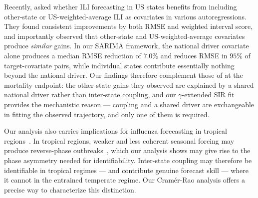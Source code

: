 \documentclass[11pt]{article}
\begin{document}
Recently, \citet{thivierge2025} asked whether ILI forecasting in US
states benefits from including other-state or US-weighted-average ILI
as covariates in various autoregressions. They found consistent
improvements by both RMSE and weighted interval score, and importantly
observed that other-state and US-weighted-average covariates produce
\emph{similar} gains. In our SARIMA framework, the national driver
covariate alone produces a median RMSE reduction of $7.0\%$ and
reduces RMSE in $95\%$ of target-covariate pairs, while individual
states contribute essentially nothing beyond the national driver. Our
findings therefore complement those of \citet{thivierge2025} at the
mortality endpoint: the other-state gains they observed are explained
by a shared national driver rather than inter-state coupling, and our
$\gamma$-extended SIR fit provides the mechanistic reason --- coupling
and a shared driver are exchangeable in fitting the observed
trajectory, and only one of them is required.

Our analysis also carries implications for influenza forecasting in
tropical regions~\citep{tsang2024}. In tropical regions, weaker and
less coherent seasonal forcing may produce reverse-phase
outbreaks~\citep{tamerius2013}, which our analysis shows may give rise
to the phase asymmetry needed for identifiability. Inter-state
coupling may therefore be identifiable in tropical regimes --- and
contribute genuine forecast skill --- where it cannot in the entrained
temperate regime. Our Cram\'er-Rao analysis offers a precise way to
characterize this distinction.
\end{document}
